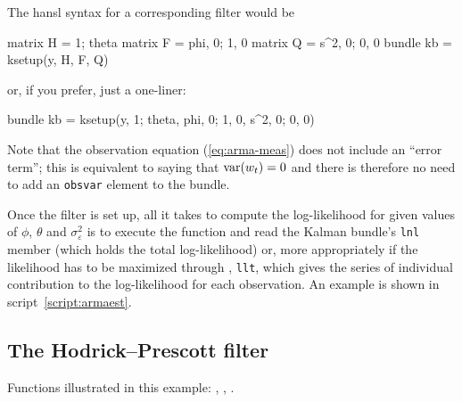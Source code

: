 The \textsf{hansl} syntax for a corresponding filter would be
\begin{code}
matrix H = {1; theta}
matrix F = {phi, 0; 1, 0}
matrix Q = {s^2, 0; 0, 0}
bundle kb = ksetup(y, H, F, Q)
\end{code}
%
or, if you prefer, just a one-liner:
\begin{code}
bundle kb = ksetup(y, {1; theta}, {phi, 0; 1, 0}, {s^2, 0; 0, 0})
\end{code}

Note that the observation equation (\ref{eq:arma-meas}) does not
include an ``error term''; this is equivalent to saying that
$\mbox{var}(w_t) = 0$ and there is therefore no need to add
an \texttt{obsvar} element to the bundle.

Once the filter is set up, all it takes to compute the log-likelihood
for given values of $\phi$, $\theta$ and $\sigma^2_{\varepsilon}$ is
to execute the  function and read the Kalman
bundle's \texttt{lnl} member (which holds the total log-likelihood)
or, more appropriately if the likelihood has to be maximized through
, \texttt{llt}, which gives the series of individual
contribution to the log-likelihood for each observation. An example is
shown in script~\ref{script:armaest}.

\subsection{The Hodrick--Prescott filter}
\label{sec:example_hp}

Functions illustrated in this example: , ,
.

